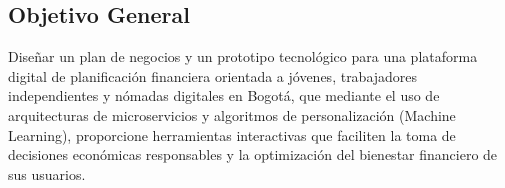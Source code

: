 \subsection*{Objetivo General}
Diseñar un plan de negocios y un prototipo tecnológico para una plataforma digital de planificación financiera orientada a jóvenes, trabajadores independientes y nómadas digitales en Bogotá, que mediante el uso de arquitecturas de microservicios y algoritmos de personalización (Machine Learning), proporcione herramientas interactivas que faciliten la toma de decisiones económicas responsables y la optimización del bienestar financiero de sus usuarios.